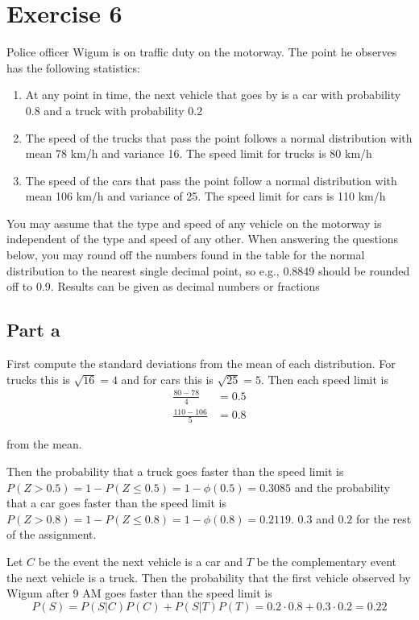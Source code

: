 \section{Exercise 6}
Police officer Wigum is on traffic duty on the motorway. The point he observes has the following statistics:

\begin{enumerate}
	\item At any point in time, the next vehicle that goes by is a car with probability 0.8 and a truck with probability 0.2
	\item The speed of the trucks that pass the point follows a normal distribution with mean 78 km/h and variance 16. The speed limit for trucks is 80 km/h
	\item The speed of the cars that pass the point follow a normal distribution with mean 106 km/h and variance of 25. The speed limit for cars is 110 km/h
\end{enumerate}

You may assume that the type and speed of any vehicle on the motorway is independent of the type and speed of any other. When answering the questions below, you may round off the numbers found in the table for the normal distribution to the nearest single decimal point, so e.g., 0.8849 should be rounded off to 0.9. Results can be given as decimal numbers or fractions

\subsection{Part a}

First compute the standard deviations from the mean of each distribution. For trucks this is $\sqrt{16} = 4$ and for cars this is $\sqrt{25} = 5$. Then each speed limit is
\begin{align*}
	\frac{80-78}{4}   & = 0.5 \\
	\frac{110-106}{5} & = 0.8
\end{align*}

from the mean.

Then the probability that a truck goes faster than the speed limit is $P(Z>0.5) = 1-P(Z\leq 0.5) = 1-\phi(0.5) = 0.3085$ and the probability that a car goes faster than the speed limit is $P(Z>0.8) = 1-P(Z\leq 0.8) = 1-\phi(0.8) = 0.2119$. $0.3$ and $0.2$ for the rest of the assignment.

Let $C$ be the event the next vehicle is a car and $T$ be the complementary event the next vehicle is a truck. Then the probability that the first vehicle observed by Wigum after 9 AM goes faster than the speed limit is
\[
	P(S) = P(S|C)P(C) + P(S|T)P(T) = 0.2\cdot 0.8 + 0.3\cdot 0.2 = 0.22
\]

